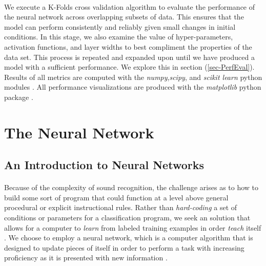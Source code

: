 \documentclass[12pt,letterpaper]{article}
\begin{document}
\paragraph*{}We execute a K-Folds cross validation algorithm to evaluate the performance of the neural network across overlapping subsets of data. This ensures that the model can perform consistently and reliably given small changes in initial conditions. In this stage, we also examine the value of hyper-parameters, activation functions, and layer widths to best compliment the properties of the data set. This process is repeated and expanded upon until we have produced a model with a sufficient performance. We explore this in section (\ref{sec-PerfEval}). Results of all metrics are computed with the \textit{numpy},\textit{scipy}, and \textit{scikit learn} python modules \cite{Numpy,Scipy,Sklearn}. All performance visualizations are produced with the \textit{matplotlib} python package \cite{Matplotlib}.


\newpage
\section{The Neural Network}
\label{sec-TheNeuralNetwork}


\subsection{An Introduction to Neural Networks}
\label{subsec-NerualNetworkIntro}

\paragraph*{} Because of the complexity of sound recognition, the challenge arises as to how to build some sort of program that could function at a level above general procedural or explicit instructional rules. Rather than \textit{hard-coding} a set of conditions or parameters for a classification program, we seek an solution that allows for a computer to \textit{learn} from labeled training examples in order \textit{teach} itself \cite{Bishop,Mitchell}. We choose to employ a neural network, which is a computer algorithm that is designed to update pieces of itself in order to perform a task with increasing proficiency as it is presented with new information \cite{Geron2,Goodfellow,Levine,Mitchell}.
\end{document}
